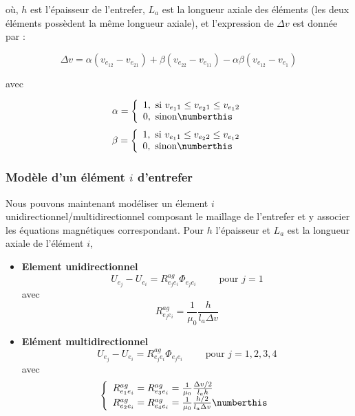 où, $h$ est l’épaisseur de l’entrefer, $L_a$ est la longueur axiale des éléments (les deux éléments
possèdent la même longueur axiale), et l’expression de $\Delta v$ est donnée par :

\begin{equation}
    \Delta v = \alpha(v_{e_12}-v_{e_21})+\beta(v_{e_22}-v_{e_11}) -\alpha\beta(v_{e_12}-v_{e_1})
\end{equation}

avec

\[
\alpha = \left\{
\begin{array}{l c l}
1, \text{ si } v_{e_11}\leq v_{e_21}\leq v_{e_12}\\
0, \text{ sinon}\numberthis
\end{array}
\right.
\]
\[
\beta = \left\{
\begin{array}{l c l}
1, \text{ si } v_{e_11}\leq v_{e_22}\leq v_{e_12}\\
0, \text{ sinon}\numberthis
\end{array}
\right.
\]

\subsubsection*{Modèle d'un élément $i$ d'entrefer}
Nous pouvons maintenant modéliser un élement $i$ unidirectionnel/multidirectionnel composant le maillage de l'entrefer et y associer les équations magnétiques correspondant. Pour $h$ l'épaisseur et $L_a$ est la longueur axiale de l'élément $i$, 

\begin{itemize}
    \item \textbf{Element unidirectionnel}
        \begin{equation}
            U_{e_j}-U_{e_i}=R_{e_je_i}^{ag}\Phi_{e_je_i} \qquad \text{ pour } j=1
        \end{equation}
        avec
        \begin{equation}
            R_{e_je_i}^{ag} = \frac{1}{\mu_0}\frac{h}{l_a\Delta v}
        \end{equation}
    
    \item \textbf{Elément multidirectionnel}
        \begin{equation}
            U_{e_j}-U_{e_i}=R_{e_je_i}^{ag}\Phi_{e_je_i} \qquad \text{ pour } j=1,2,3,4
        \end{equation}
        avec
        \[
        \left\{
        \begin{array}{l c l}
        R_{e_1e_i}^{ag}=R_{e_3e_i}^{ag} = \frac{1}{\mu_0}\frac{\Delta v/2}{l_ah}\\
        R_{e_2e_i}^{ag}=R_{e_4e_i}^{ag} = \frac{1}{\mu_0}\frac{h/2}{l_a\Delta v}\numberthis
        \end{array}
        \right.
        \]
        
\end{itemize}


